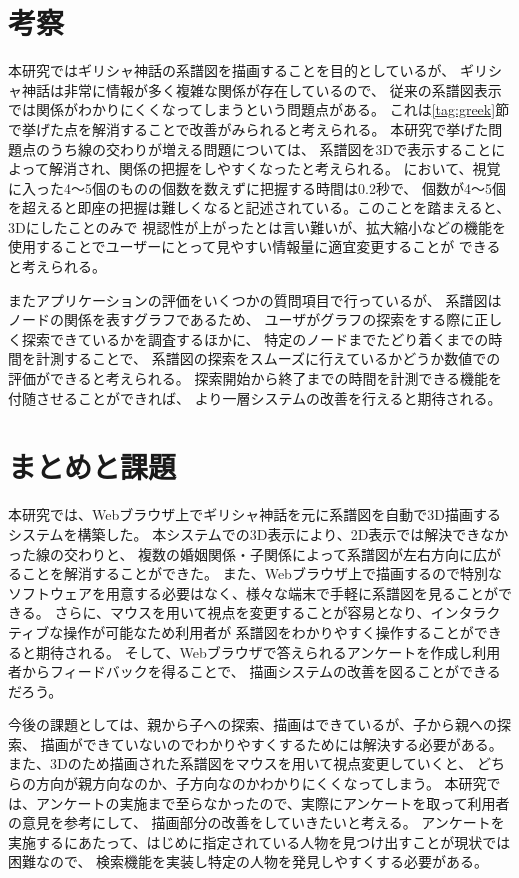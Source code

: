 \section{考察}
本研究ではギリシャ神話の系譜図を描画することを目的としているが、
ギリシャ神話は非常に情報が多く複雑な関係が存在しているので、
従来の系譜図表示では関係がわかりにくくなってしまうという問題点がある。
これは\ref{tag:greek}節で挙げた点を解消することで改善がみられると考えられる。
本研究で挙げた問題点のうち線の交わりが増える問題については、
系譜図を3Dで表示することによって解消され、関係の把握をしやすくなったと考えられる。
\cite{ui}において、視覚に入った4〜5個のものの個数を数えずに把握する時間は0.2秒で、
個数が4〜5個を超えると即座の把握は難しくなると記述されている。このことを踏まえると、3Dにしたことのみで
視認性が上がったとは言い難いが、拡大縮小などの機能を使用することでユーザーにとって見やすい情報量に適宜変更することが
できると考えられる。

またアプリケーションの評価をいくつかの質問項目で行っているが、
系譜図はノードの関係を表すグラフであるため、
ユーザがグラフの探索をする際に正しく探索できているかを調査するほかに、
特定のノードまでたどり着くまでの時間を計測することで、
系譜図の探索をスムーズに行えているかどうか数値での評価ができると考えられる。
探索開始から終了までの時間を計測できる機能を付随させることができれば、
より一層システムの改善を行えると期待される。


\section{まとめと課題}
\label{tag:summary}
本研究では、Webブラウザ上でギリシャ神話を元に系譜図を自動で3D描画するシステムを構築した。
本システムでの3D表示により、2D表示では解決できなかった線の交わりと、
複数の婚姻関係・子関係によって系譜図が左右方向に広がることを解消することができた。
また、Webブラウザ上で描画するので特別なソフトウェアを用意する必要はなく、様々な端末で手軽に系譜図を見ることができる。
さらに、マウスを用いて視点を変更することが容易となり、インタラクティブな操作が可能なため利用者が
系譜図をわかりやすく操作することができると期待される。
そして、Webブラウザで答えられるアンケートを作成し利用者からフィードバックを得ることで、
描画システムの改善を図ることができるだろう。

今後の課題としては、親から子への探索、描画はできているが、子から親への探索、
描画ができていないのでわかりやすくするためには解決する必要がある。
また、3Dのため描画された系譜図をマウスを用いて視点変更していくと、
どちらの方向が親方向なのか、子方向なのかわかりにくくなってしまう。
本研究では、アンケートの実施まで至らなかったので、実際にアンケートを取って利用者の意見を参考にして、
描画部分の改善をしていきたいと考える。
アンケートを実施するにあたって、はじめに指定されている人物を見つけ出すことが現状では困難なので、
検索機能を実装し特定の人物を発見しやすくする必要がある。


